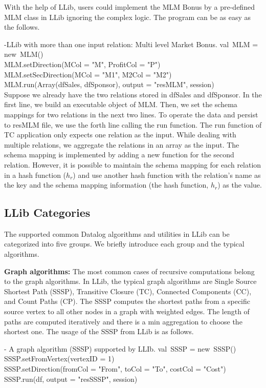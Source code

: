 With the help of LLib, users could implement the MLM Bonus by a pre-defined MLM class in LLib  ignoring the complex logic. The program can be as easy as the follows.

\vspace{0.5em}
 -LLib with more than one input relation: Multi level Market Bonus.
\bldl
val\ MLM = new\ MLM() \\
MLM.setDirection(MCol = "M", ProfitCol = "P")\\
MLM.setSecDirection(MCol = "M1", M2Col = "M2") \\
MLM.run(Array(dfSales, dfSponsor), output = "resMLM", session) \\

\eldl
Suppose we already have the two relations stored in dfSales and dfSponsor. In the first line, we build an executable object of MLM. Then, we set the schema mappings for two relations in the next two lines. To operate the data and persist to resMLM file, we use the forth line calling the run function.  The run function of TC application only expects one relation as the input. While dealing with multiple relations, we aggregate the relations in an array as the input. The schema mapping is implemented by adding a new function for the second relation. However, it is possible to  maintain the schema mapping for each relation in a hash function ($h_r$) and use another hash function with the relation's name as the key and the schema mapping information (the hash function, $h_r$) as the value. 
\subsection{LLib Categories}
The supported common Datalog algorithms and utilities in LLib can be  categorized into five groups. We briefly introduce each group and the typical algorithms. 

\textbf{Graph algorithms:} The most common cases of recursive computations  belong to the graph algorithms. In LLib, the typical graph algorithms are Single Source Shortest Path (SSSP), Transitive Closure (TC), Connected Components (CC), and Count Paths (CP). The SSSP  computes the shortest paths from a specific source vertex to all other nodes in a graph with weighted edges. The length of paths are computed iteratively and there is a min aggregation to choose the shortest one. The usage of the SSSP from LLib is as follows.

\vspace{0.5em}
 - A graph algorithm (SSSP) supported by LLIb.
\bldl
val\ SSSP = new\ SSSP() \\
SSSP.setFromVertex(vertexID = 1) \\
SSSP.setDirection(fromCol = "From", toCol = "To", costCol = "Cost") \\
SSSP.run(df, output = "resSSSP", session) \\


